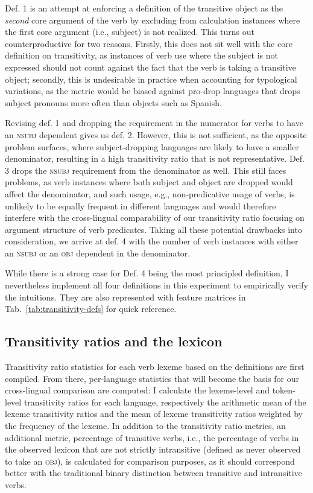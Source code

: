 Def. 1 is an attempt at enforcing a definition of the transitive object as the \textit{second} core argument of the verb by excluding from calculation instances where the first core argument (i.e., subject) is not realized. This turns out counterproductive for two reasons. Firstly, this does not sit well with the core definition on transitivity, as instances of verb use where the subject is not expressed should not count against the fact that the verb is taking a transitive object; secondly, this is undesirable in practice when accounting for typological variations, as the metric would be biased against pro-drop languages that drops subject pronouns more often than objects such as Spanish.

Revising def. 1 and dropping the requirement in the numerator for verbs to have an \textsc{nsubj} dependent gives us def. 2. However, this is not sufficient, as the opposite problem surfaces, where subject-dropping languages are likely to have a smaller denominator, resulting in a high transitivity ratio that is not representative. Def. 3 drops the \textsc{nsubj} requirement from the denominator as well. This still faces problems, as verb instances where both subject and object are dropped would affect the denominator, and such usage, e.g., non-predicative usage of verbs, is unlikely to be equally frequent in different languages and would therefore interfere with the cross-lingual comparability of our transitivity ratio focusing on argument structure of verb predicates. Taking all these potential drawbacks into consideration, we arrive at def. 4 with the number of verb instances with either an \textsc{nsubj} or an \textsc{obj} dependent in the denominator. 



While there is a strong case for Def. 4 being the most principled definition, I nevertheless implement all four definitions in this experiment to empirically verify the intuitions. They are also represented with feature matrices in Tab.~\ref{tab:transitivity-defs} for quick reference.

\subsection{Transitivity ratios and the lexicon}

Transitivity ratio statistics for each verb lexeme based on the definitions are first compiled. From there, per-language statistics that will become the basis for our cross-lingual comparison are computed: I calculate the lexeme-level and token-level transitivity ratios for each language, respectively the arithmetic mean of the lexeme transitivity ratios and the mean of lexeme transitivity ratios weighted by the frequency of the lexeme. In addition to the transitivity ratio metrics, an additional metric, percentage of transitive verbs, i.e., the percentage of verbs in the observed lexicon that are not strictly intransitive (defined as never observed to take an \textsc{obj}), is calculated for comparison purposes, as it should correspond better with the traditional binary distinction between transitive and intransitive verbs.

